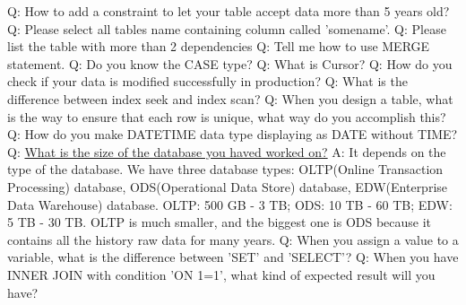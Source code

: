 \documentclass[a4paper,11pt]{article}
\begin{document}
\noindent 
Q: How to add a constraint to let your table accept data more than 5 years old? \newline \newline
\noindent 
Q: Please select all tables name containing column called 'somename'. \newline \newline
\noindent 
Q: Please list the table with more than 2 dependencies \newline \newline
\noindent 
Q: Tell me how to use MERGE statement. \newline \newline
\noindent 
Q: Do you know the CASE type? \newline \newline
\noindent 
Q: What is Cursor? \newline \newline
\noindent 
Q: How do you check if your data is modified successfully in production? \newline \newline
\noindent 
Q: What is the difference between index seek and index scan? \newline \newline
\noindent 
Q: When you design a table, what is the way to ensure that each row is unique, what way do you accomplish this? \newline \newline
\noindent 
Q: How do you make DATETIME data type displaying as DATE without TIME? \newline \newline
\noindent 
Q: \underline{What is the size of the database you haved worked on?} \newline
A: It depends on the type of the database. We have three database types: OLTP(Online Transaction Processing) database, ODS(Operational Data Store) database, EDW(Enterprise Data Warehouse) database. OLTP: 500 GB - 3 TB; ODS: 10 TB - 60 TB; EDW: 5 TB - 30 TB. OLTP is much smaller, and the biggest one is ODS because it contains all the history raw data for many years.\newline \newline
\noindent 
Q: When you assign a value to a variable, what is the difference between 'SET' and 'SELECT'? \newline \newline
\noindent 
Q: When you have INNER JOIN with condition 'ON 1=1', what kind of expected result will you have? \newline \newline
\end{document}
